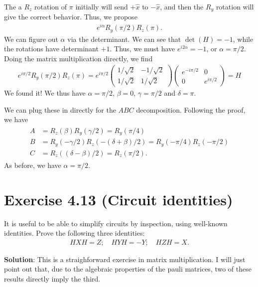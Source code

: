 \documentclass{book}
\begin{document}
    The a $R_z$ rotation of $\pi$ initially will send $+\hat{x}$ to $-\hat{x}$, and then the $R_y$ rotation will give the correct behavior. Thus, we propose
    \begin{align}
        e^{i\alpha} R_y(\pi/2) R_z(\pi).
    \end{align}
    We can figure out $\alpha$ via the determinant. We can see that $\det(H) = -1$, while the rotations have determinant $+1$. Thus, we must have $e^{i2\alpha} = -1$, or $\alpha = \pi/2$. Doing the matrix multiplication directly, we find
    \begin{align}
        e^{i\pi/2} R_y (\pi/2) R_z(\pi) = e^{i\pi/2} \begin{pmatrix}
            1/\sqrt{2} & -1/\sqrt{2} \\
            1/\sqrt{2} & 1/\sqrt{2}
        \end{pmatrix} \begin{pmatrix}
            e^{-i\pi/2} & 0 \\
            0 & e^{i\pi/2}
        \end{pmatrix} = H
    \end{align}
    We found it! We thus have $\alpha = \pi/2$, $\beta = 0$, $\gamma = \pi/2$ and $\delta = \pi$.

    We can plug these in directly for the $ABC$ decomposition. Following the proof, we have
    \begin{align}
    \begin{aligned}
        A &= R_z(\beta) R_y(\gamma/2) = R_y(\pi/4) \\
        B &= R_y(-\gamma/2) R_z(-(\delta + \beta)/2) = R_y(-\pi/4)R_z(-\pi/2)\\
        C &= R_z((\delta - \beta)/2) = R_z(\pi/2).
    \end{aligned}
    \end{align}
    As before, we have $\alpha = \pi/2$.

\section*{Exercise 4.13 (Circuit identities)}
    It is useful to be able to simplify circuits by inspection, using well-known identities. Prove the following three identities:
    \begin{align}
        HXH = Z;\quad HYH = -Y; \quad HZH = X.
    \end{align}

    \textbf{Solution}: This is a straighforward exercise in matrix multiplication. I will just point out that, due to the algebraic properties of the pauli matrices, two of these results directly imply the third. 
\end{document}
